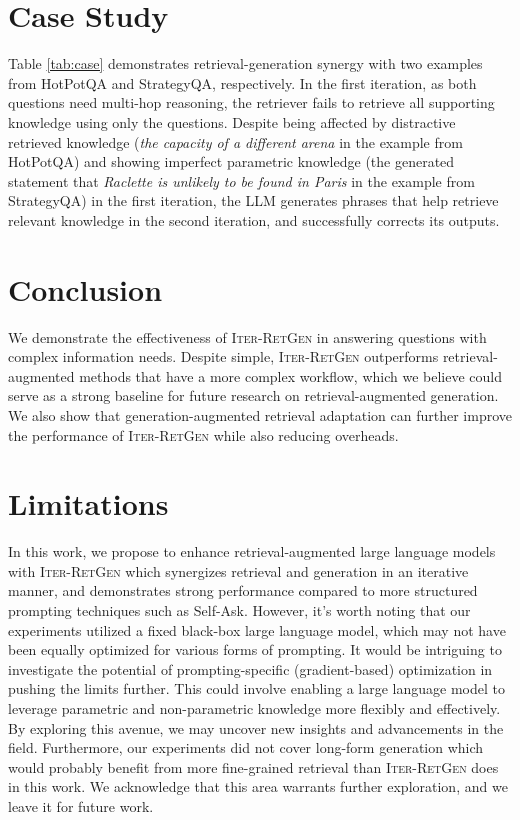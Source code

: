 \documentclass[11pt]{article}
\begin{document}
\section{Case Study}
Table \ref{tab:case} demonstrates retrieval-generation synergy with two examples from HotPotQA and StrategyQA, respectively.
In the first iteration, as both questions need multi-hop reasoning, the retriever fails to retrieve all supporting knowledge using only the questions.
Despite being affected by distractive retrieved knowledge (\textit{the capacity of a different arena} in the example from HotPotQA) and showing imperfect parametric knowledge (the generated statement that \textit{Raclette is unlikely to be found in Paris} in the example from StrategyQA) in the first iteration, the LLM generates phrases that help retrieve relevant knowledge in the second iteration, and successfully corrects its outputs.

\section{Conclusion}
We demonstrate the effectiveness of I\textsc{ter}-R\textsc{et}G\textsc{en} in answering questions with complex information needs.
Despite simple, I\textsc{ter}-R\textsc{et}G\textsc{en} outperforms retrieval-augmented methods that have a more complex workflow, which we believe could serve as a strong baseline for future research on retrieval-augmented generation.
We also show that generation-augmented retrieval adaptation can further improve the performance of I\textsc{ter}-R\textsc{et}G\textsc{en} while also reducing overheads.

\section*{Limitations}
In this work, we propose to enhance retrieval-augmented large language models with I\textsc{ter}-R\textsc{et}G\textsc{en} which synergizes retrieval and generation in an iterative manner, and demonstrates strong performance compared to more structured prompting techniques such as Self-Ask.
However, it's worth noting that our experiments utilized a fixed black-box large language model, which may not have been equally optimized for various forms of prompting.
It would be intriguing to investigate the potential of prompting-specific (gradient-based) optimization in pushing the limits further.
This could involve enabling a large language model to leverage parametric and non-parametric knowledge more flexibly and effectively. 
By exploring this avenue, we may uncover new insights and advancements in the field.
Furthermore, our experiments did not cover long-form generation which would probably benefit from more fine-grained retrieval than I\textsc{ter}-R\textsc{et}G\textsc{en} does in this work.
We acknowledge that this area warrants further exploration, and we leave it for future work.
\end{document}
